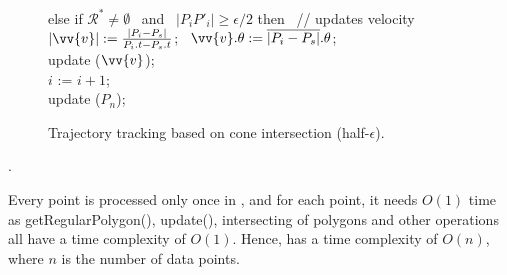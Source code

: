 {\begin{figure}[tb!]
\begin{center}
{\begin{minipage}{3.3in}
{					\icc \>\hspace{3ex} else if $\mathcal{R}^* \ne \emptyset$ ~and~ $|P_iP'_i| \ge \epsilon/2 $ then   ~// updates velocity \\
					\icc \>\hspace{7ex}    $|\vv{v}|:=\frac{|P_i-P_s|}{P_i.t-P_s.t}$; ~$\vv{v}.\theta:=\overline{|P_i-P_s|}.\theta$; \\
					\icc \>\hspace{7ex}    update ($\vv{v}$); \\
					\icc \>\hspace{3ex} $i$ := $i +1$;	\\
					\icc \>\hspace{0ex} update ($P_{n}$); 
				}
				\vspace{-2ex}
				\myhrule
			\end{minipage}
		}
	\end{center}
	\vspace{-1ex}
	\caption{\small Trajectory tracking based on cone intersection (half-$\epsilon$).}
	\label{alg:citt-s-half}
	\vspace{-1ex}
\end{figure}
}

\begin{example}
	\todo.
\end{example}


Every point is processed only once in \citt, and for each point, it needs $O(1)$ time as getRegularPolygon(), update(), intersecting of polygons and other operations all have a time complexity of $O(1)$. Hence, \citt has a time complexity of $O(n)$, where $n$ is the number of data points.






